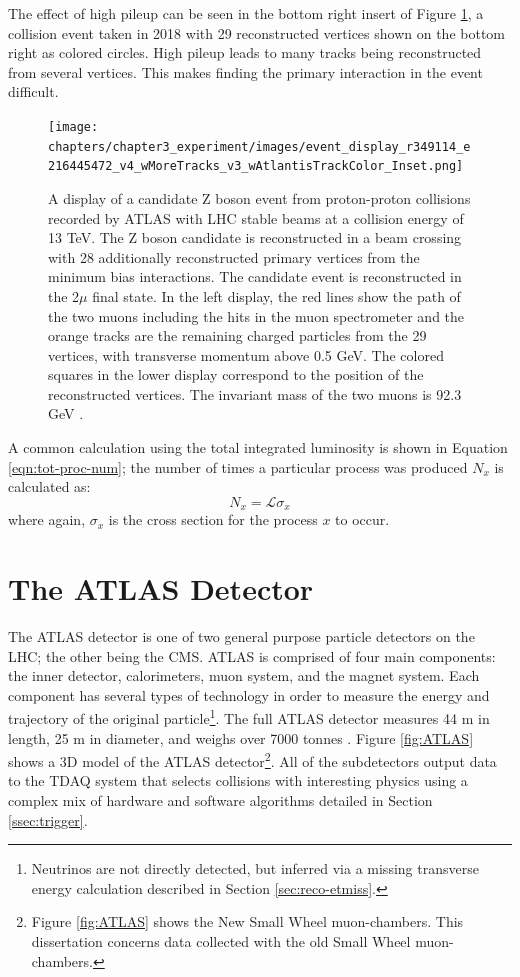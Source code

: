 		The effect of high pileup can be seen in the bottom right insert of Figure \ref{fig:high-pileup-event-display}, a collision event taken in 2018 with 29 reconstructed vertices shown on the bottom right as colored circles. High pileup leads to many tracks being reconstructed from several vertices. This makes finding the primary interaction in the event difficult.
		\begin{figure}[!ht]
		\centering
		\texttt{[image: chapters/chapter3\_experiment/images/event\_display\_r349114\_e216445472\_v4\_wMoreTracks\_v3\_wAtlantisTrackColor\_Inset.png]}
		\caption{ A display of a candidate Z boson event from proton-proton collisions recorded by \gls{ATLAS} with \gls{LHC} stable beams at a collision energy of 13 TeV. The Z boson candidate is reconstructed in a beam crossing with 28 additionally reconstructed primary vertices from the minimum bias interactions. The candidate event is reconstructed in the 2$\mu$ final state. In the left display, the red lines show the path of the two muons including the hits in the muon spectrometer and the orange tracks are the remaining charged particles from the 29 vertices, with transverse momentum above 0.5 GeV. The colored squares in the lower display correspond to the position of the reconstructed vertices. The invariant mass of the two muons is 92.3 GeV \cite{eventdisplayrun2physics}. }
		\label{fig:high-pileup-event-display}
		\end{figure}


		A common calculation using the total integrated luminosity is shown in Equation \ref{eqn:tot-proc-num}; the number of times a particular process was produced $N_{x}$ is calculated as:
		\begin{equation}\label{eqn:tot-proc-num}
		N_{x} = \mathcal{L} \sigma_{x}
		\end{equation}
		where again, $\sigma_{x}$ is the cross section for the process $x$ to occur.


\section{The \gls{ATLAS} Detector}\label{sec:ATLAS}
	The \acrfull{ATLAS} detector is one of two general purpose particle detectors on the \gls{LHC}; the other being the \acrfull{CMS}. \gls{ATLAS} is comprised of four main components: the inner detector, calorimeters, muon system, and the magnet system. Each component has several types of technology in order to measure the energy and trajectory of the original particle\footnote{Neutrinos are not directly detected, but inferred via a missing transverse energy calculation described in Section \ref{sec:reco-etmiss}.}. The full \gls{ATLAS} detector measures 44 m in length, 25 m in diameter, and weighs over 7000 tonnes \cite{ATLAS-JINST} . Figure \ref{fig:ATLAS} shows a 3D model of the \gls{ATLAS} detector\footnote{Figure \ref{fig:ATLAS} shows the New Small Wheel muon-chambers. This dissertation concerns data collected with the old Small Wheel muon-chambers.}. All of the subdetectors output data to the \gls{TDAQ} system that selects collisions with interesting physics using a complex mix of hardware and software algorithms detailed in Section \ref{ssec:trigger}. 

